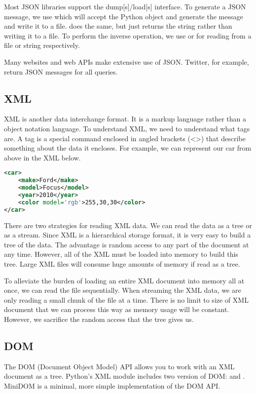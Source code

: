 Most JSON libraries support the dump[s]/load[s] interface.
To generate a JSON message, we use  which will accept the Python object and generate the message and write it to a file.
 does the same, but just returns the string rather than writing it to a file.
To perform the inverse operation, we use  or  for reading from a file or string respectively.

Many websites and web APIs make extensive use of JSON.
Twitter, for example, return JSON messages for all queries.

\subsection*{XML}
XML is another data interchange format.  It is a markup language rather than a object notation language.
To understand XML, we need to understand what tags are.
A tag is a special command enclosed in angled brackets (<>) that describe something about the data it encloses.
For example, we can represent our car from above in the XML below.
\begin{lstlisting}[language=XML]
<car>
    <make>Ford</make>
    <model>Focus</model>
    <year>2010</year>
    <color model='rgb'>255,30,30</color>
</car>
\end{lstlisting}
There are two strategies for reading XML data.
We can read the data as a tree or as a stream.
Since XML is a hierarchical storage format, it is very easy to build a tree of the data.
The advantage is random access to any part of the document at any time.
However, all of the XML must be loaded into memory to build this tree.
Large XML files will consume huge amounts of memory if read as a tree.

To alleviate the burden of loading an entire XML document into memory all at once, we can read the file sequentially.
When streaming the XML data, we are only reading a small chunk of the file at a time.
There is no limit to size of XML document that we can process this way as memory usage will be constant.
However, we sacrifice the random access that the tree gives us.

\subsection*{DOM}
The DOM (Document Object Model) API allows you to work with an XML document as a tree.
Python's XML module includes two version of DOM:  and .
MiniDOM is a minimal, more simple implementation of the DOM API.


